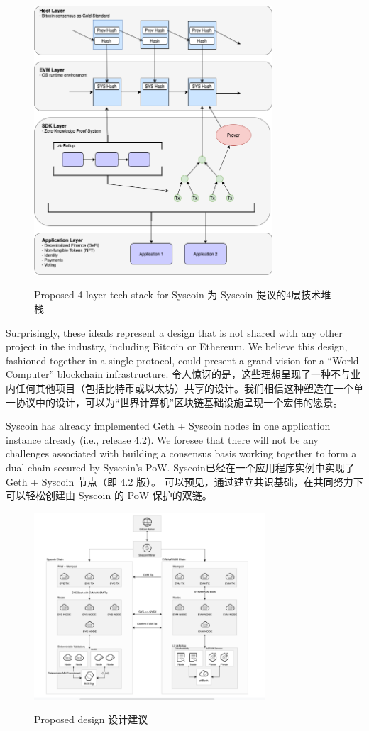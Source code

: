 \documentclass{ctexart}
\begin{document}
\begin{figure}[h!]
\centering
\includegraphics[width=3.5in]{img/4_layer.png}
\label{fig:tech_stack}
\caption{Proposed 4-layer tech stack for Syscoin 为 Syscoin 提议的4层技术堆栈} 
\end{figure} 

Surprisingly, these ideals represent a design that is not shared with any other project in the industry, including Bitcoin or Ethereum. We believe this design, fashioned together in a single protocol, could present a grand vision for a “World Computer” blockchain infrastructure. 令人惊讶的是，这些理想呈现了一种不与业内任何其他项目（包括比特币或以太坊）共享的设计。我们相信这种塑造在一个单一协议中的设计，可以为“世界计算机”区块链基础设施呈现一个宏伟的愿景。

Syscoin has already implemented Geth + Syscoin nodes in one application instance already (i.e., release 4.2). We foresee that there will not be any challenges associated with building a consensus basis working together to form a dual chain secured by Syscoin’s PoW. Syscoin已经在一个应用程序实例中实现了 Geth + Syscoin 节点（即 4.2 版）。 可以预见，通过建立共识基础，在共同努力下可以轻松创建由 Syscoin 的 PoW 保护的双链。

\begin{figure}[h!]
\centering
\includegraphics[width=3.4in]{img/fig_5.png}
\label{fig:proposed_design}
\caption{Proposed design 设计建议} 
\end{figure} 
\end{document}
